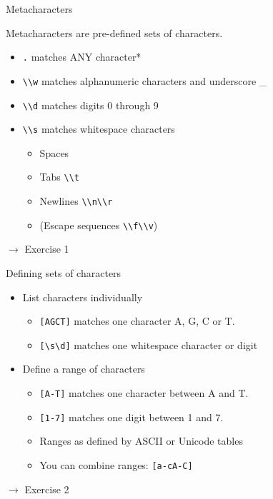 \documentclass{beamer}
\begin{document}
\begin{frame}{Metacharacters}

Metacharacters are pre-defined sets of characters.
 \begin{itemize}
  \item \lstinline$.$ matches ANY character*
  \item \lstinline$\\w$ matches alphanumeric characters and underscore \_
  \item \lstinline$\\d$ matches digits 0 through 9
  \item \lstinline$\\s$ matches whitespace characters
    \begin{itemize}
     \item Spaces 
     \item Tabs \lstinline$\\t$
     \item Newlines \lstinline$\\n\\r$
     \item (Escape sequences \lstinline$\\f\\v$)
    \end{itemize}
 \end{itemize}

 \bigskip
 $\rightarrow$ Exercise 1
\end{frame}

\begin{frame}{Defining sets of characters}
 \begin{itemize}
  \item List characters individually
    \begin{itemize}
      \item \lstinline$[AGCT]$ matches one character A, G, C or T.
      \item \lstinline$[\s\d]$ matches one whitespace character or digit
    \end{itemize}
  \item Define a range of characters
    \begin{itemize}
      \item \lstinline$[A-T]$ matches one character between A and T.
      \item \lstinline$[1-7]$ matches one digit between 1 and 7.
      \item Ranges as defined by ASCII or Unicode tables
      \item You can combine ranges: \lstinline$[a-cA-C]$
    \end{itemize}
 \end{itemize}

 \bigskip
 $\rightarrow$ Exercise 2

\end{frame}
\end{document}
